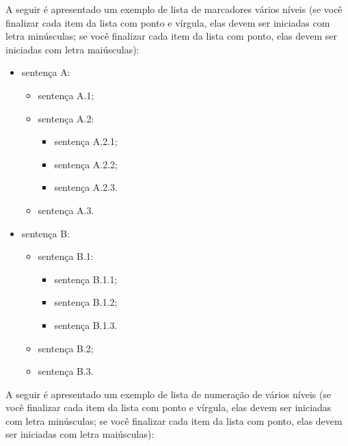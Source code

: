 \documentclass[
	12pt,				%
	oneside,			%
	a4paper,			%
	english,			%
	brazil				%
	]{abntex2ppgsi}
\begin{document}
A seguir é apresentado um exemplo de lista de marcadores vários níveis (se você finalizar cada item da lista com ponto e vírgula, elas devem ser iniciadas com letra minúsculas; se você finalizar cada item da lista com ponto, elas devem ser iniciadas com letra maiúsculas):
\begin{itemize}
	\item sentença A:
  \begin{itemize}
	   \item sentença A.1;
	   \item sentença A.2:
     \begin{itemize}
	      \item sentença A.2.1;
	      \item sentença A.2.2;
	      \item sentença A.2.3.
     \end{itemize}
	   \item sentença A.3.
  \end{itemize}
	\item sentença B:
  \begin{itemize}
	   \item sentença B.1:
     \begin{itemize}
	      \item sentença B.1.1;
	      \item sentença B.1.2;
	      \item sentença B.1.3.
     \end{itemize}
	   \item sentença B.2;
	   \item sentença B.3.
  \end{itemize}
\end{itemize}

A seguir é apresentado um exemplo de lista de numeração de vários níveis (se você finalizar cada item da lista com ponto e vírgula, elas devem ser iniciadas com letra minúsculas; se você finalizar cada item da lista com ponto, elas devem ser iniciadas com letra maiúsculas):
\end{document}

